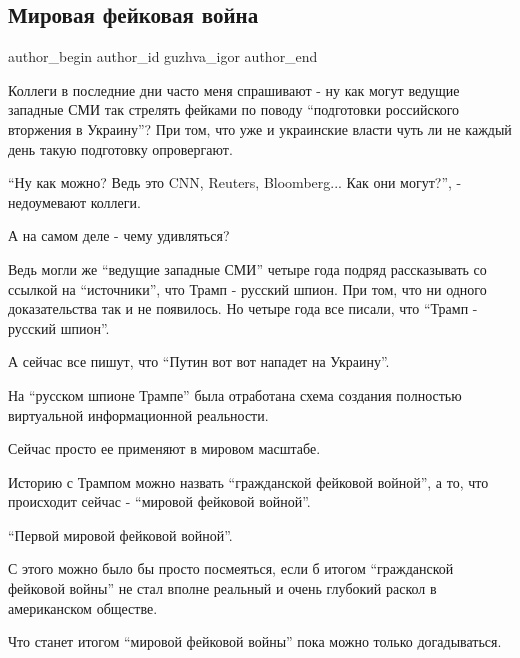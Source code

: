  
 
 
 
 
 
\subsection{Мировая фейковая война}
\label{sec:31_01_2022.fb.guzhva_igor.1.mirovaja_fejkovaja_vojna}
 
\ifcmt
 author_begin
   author_id guzhva_igor
 author_end
\fi

Коллеги в последние дни часто меня спрашивают - ну как могут ведущие западные
СМИ так стрелять фейками по поводу \enquote{подготовки российского вторжения в
Украину}? При том, что уже и украинские власти чуть ли не каждый день такую
подготовку опровергают.

\enquote{Ну как можно? Ведь это CNN, Reuters, Bloomberg... Как они могут?}, -
недоумевают коллеги.

А на самом деле - чему удивляться? 

Ведь могли же \enquote{ведущие западные СМИ} четыре года подряд рассказывать со ссылкой
на \enquote{источники}, что Трамп - русский шпион. При том, что ни одного
доказательства так и не появилось. Но четыре года все писали, что \enquote{Трамп -
русский шпион}.

А сейчас все пишут, что \enquote{Путин вот вот нападет на Украину}.

На \enquote{русском шпионе Трампе} была отработана схема создания полностью виртуальной
информационной реальности.

Сейчас просто ее применяют в мировом масштабе.

Историю с Трампом можно назвать \enquote{гражданской фейковой войной}, а то, что
происходит сейчас - \enquote{мировой фейковой войной}.

\enquote{Первой мировой фейковой войной}.

С этого можно было бы просто посмеяться, если б итогом \enquote{гражданской фейковой
войны} не стал вполне реальный и очень глубокий раскол в американском обществе.

Что станет итогом \enquote{мировой фейковой войны} пока можно только догадываться.
